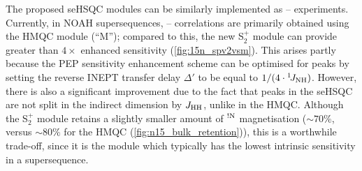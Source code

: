 \documentclass[11pt]{article}
\newcommand*{\noahSpb}{S$^+_2$}
\newcommand*{\proton}{\ce{^{1}H}}
\newcommand*{\nitrogen}{\ce{^{15}N}}
\newcommand*{\onejnh}{{}^{1}\!J_{\ce{NH}}}
\newcommand*{\magnnot}[1]{\ce{^1H}$^{!#1}$}
\newcommand*{\jhh}{J_{\ce{HH}}}
\begin{document}
\begin{refsection}
The proposed seHSQC modules can be similarly implemented as \proton{}--\nitrogen{} experiments.
Currently, in NOAH supersequences, \proton{}--\nitrogen{} correlations are primarily obtained using the HMQC module (``M'');\autocite{Kupce2007MRC, Kupce2017ACIE} compared to this, the new \noahSpb{} module can provide greater than $4\times$ enhanced sensitivity (\cref{fig:15n_spv2vsm}).
This arises partly because the PEP sensitivity enhancement scheme can be optimised for  peaks by setting the reverse INEPT transfer delay $\Delta'$ to be equal to $1/(4 \cdot\onejnh)$.
However, there is also a significant improvement due to the fact that peaks in the \nitrogen{} seHSQC are not split in the indirect dimension by $\jhh$, unlike in the HMQC.
Although the \noahSpb{} module retains a slightly smaller amount of \magnnot{\ce{N}} magnetisation ($\sim 70\%$, versus $\sim 80\%$ for the HMQC (\cref{fig:n15_bulk_retention})), this is a worthwhile trade-off, since it is the \nitrogen{} module which typically has the lowest intrinsic sensitivity in a supersequence.


\end{refsection}
\end{document}
